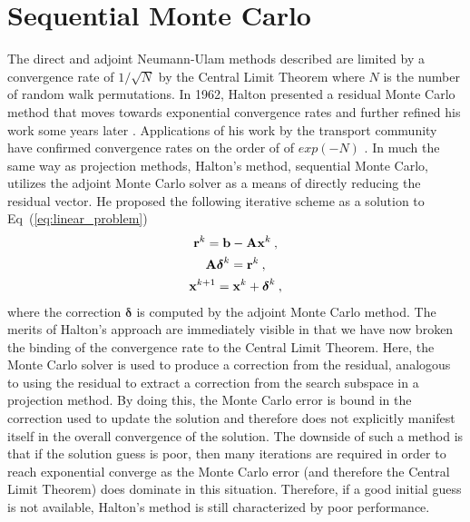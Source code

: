\section{Sequential Monte Carlo}
\label{sec:sequential_mc}
The direct and adjoint Neumann-Ulam methods described are limited by a
convergence rate of $1/\sqrt{N}$ by the Central Limit Theorem where
$N$ is the number of random walk permutations. In 1962, Halton
presented a residual Monte Carlo method that moves towards exponential
convergence rates \citep{halton_sequential_1962} and further refined
his work some years later \citep{halton_sequential_1994}. Applications
of his work by the transport community have confirmed convergence
rates on the order of of $exp(-N)$ \citep{evans_residual_2003}. In
much the same way as projection methods, Halton's method, sequential
Monte Carlo, utilizes the adjoint Monte Carlo solver as a means of
directly reducing the residual vector. He proposed the following
iterative scheme as a solution to Eq~(\ref{eq:linear_problem})\:
\begin{subequations}
  \begin{gather}
    \mathbf{r}^k = \mathbf{b} - \mathbf{A}\mathbf{x}^k\:,\\  
    \mathbf{A}\boldsymbol{\delta}^{k} = \mathbf{r}^{k}\:,\\
    \mathbf{x}^{k+1} = \mathbf{x}^k + \boldsymbol{\delta}^{k}\:,
  \end{gather}
  \label{eq:sequential_monte_carlo}
\end{subequations}
where the correction $\boldsymbol{\delta}$ is computed by the adjoint
Monte Carlo method. The merits of Halton's approach are immediately
visible in that we have now broken the binding of the convergence rate
to the Central Limit Theorem. Here, the Monte Carlo solver is used to
produce a correction from the residual, analogous to using the
residual to extract a correction from the search subspace in a
projection method. By doing this, the Monte Carlo error is bound in
the correction used to update the solution and therefore does not
explicitly manifest itself in the overall convergence of the
solution. The downside of such a method is that if the solution guess
is poor, then many iterations are required in order to reach
exponential converge as the Monte Carlo error (and therefore the
Central Limit Theorem) does dominate in this situation. Therefore, if
a good initial guess is not available, Halton's method is still
characterized by poor performance.

